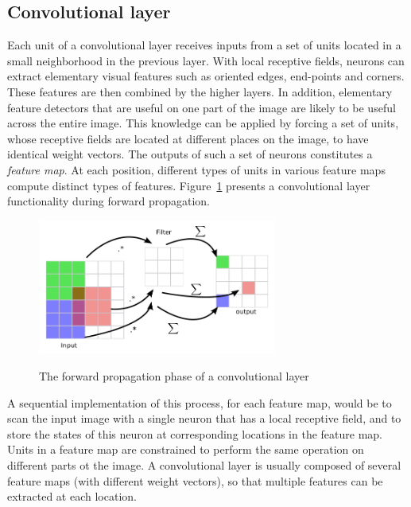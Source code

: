 \subsection{Convolutional layer} 

Each unit of a convolutional layer receives inputs from a set of units located in a small neighborhood in the previous layer. With local receptive fields, neurons can extract elementary visual features such as oriented edges, end-points and corners. These features are then combined by the higher layers\cite{lecun2010convolutional}. In addition, elementary feature detectors that are useful on one part of the image are likely to be useful across the entire image. This knowledge can be applied by forcing a set of units, whose receptive fields are located at different places on the image, to have identical weight vectors\cite{williams1986learning}. The outputs of such a set of neurons constitutes a \textit{feature map}. At each position, different types of units in various feature maps compute distinct types of features. Figure~\ref{fig:cnnsample} presents a convolutional layer functionality during forward propagation. 

\begin{figure}[H]
	\centering
	{\includegraphics[width=0.7\textwidth]{images/conv}}
	\caption{The forward propagation phase of a convolutional layer}
	\label{fig:cnnsample}
\end{figure}
 
A sequential implementation of this process, for each feature map, would be to scan the input image with a single neuron that has a local receptive field, and to store the states of this neuron at corresponding locations in the feature map\cite{lecun2010convolutional}. \\
\indent Units in a feature map are constrained to perform the same operation on different parts ot the image. A convolutional layer is usually composed of several feature maps (with different weight vectors), so that multiple features can be extracted at each location. 

